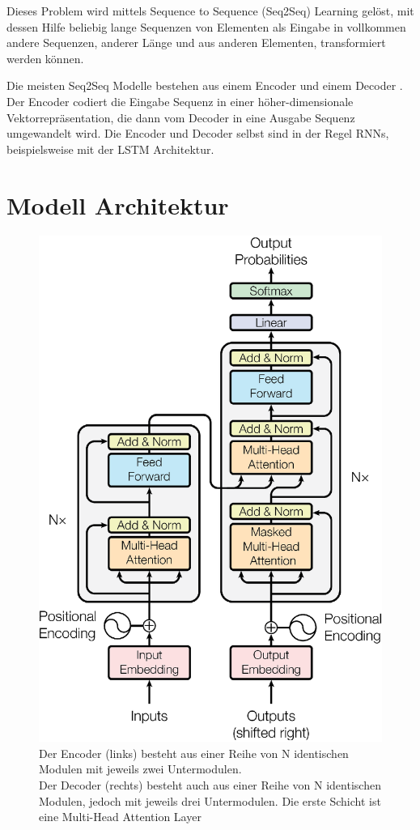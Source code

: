 \documentclass[conference]{IEEEtran}
\begin{document}
Dieses Problem wird mittels Sequence to Sequence (Seq2Seq) Learning gelöst, mit dessen Hilfe beliebig lange Sequenzen von Elementen als Eingabe in vollkommen andere Sequenzen, anderer Länge und aus anderen Elementen, transformiert werden können. \cite{sequence_to_sequence}

Die meisten Seq2Seq Modelle bestehen aus einem Encoder und einem Decoder \cite{attention_is_all_you_need}. Der Encoder codiert die Eingabe Sequenz in einer höher-dimensionale Vektorrepräsentation, die dann vom Decoder in eine Ausgabe Sequenz umgewandelt wird. Die Encoder und Decoder selbst sind in der Regel RNNs, beispielsweise mit der LSTM Architektur.


\section{Modell Architektur}

\begin{figure}[htbp]
\centerline{\includegraphics{img/figure1.png}}
\caption{Der Encoder (links) besteht aus einer Reihe von N identischen Modulen mit jeweils zwei Untermodulen. \\
Der Decoder (rechts) besteht auch aus einer Reihe von N identischen Modulen, jedoch mit jeweils drei Untermodulen. Die erste Schicht ist eine Multi-Head Attention Layer \cite{attention_is_all_you_need}}
\label{fig}
\end{figure}
\end{document}
